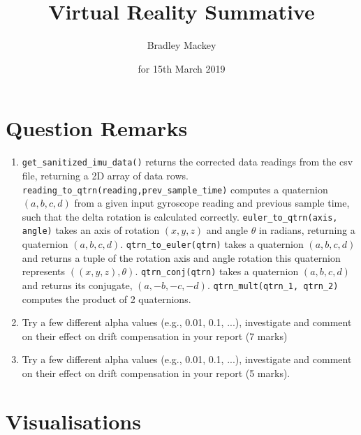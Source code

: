 \documentclass[11pt]{article}
\makeatletter
\newcommand{\skipitems}[1]{%
  \addtocounter{\@enumctr}{#1}%
}
\makeatother
\begin{document}
\title{\textbf{Virtual Reality Summative}}
\date{for 15th March 2019}
\author{Bradley Mackey}
\maketitle


\section*{Question Remarks}

\begin{enumerate}
\item \texttt{get\_sanitized\_imu\_data()} returns the corrected data readings from the csv file, returning a 2D array of data rows. \texttt{reading\_to\_qtrn(reading,prev\_sample\_time)} computes a quaternion $(a,b,c,d)$ from a given input gyroscope reading and previous sample time, such that the delta rotation is calculated correctly. \texttt{euler\_to\_qtrn(axis, angle)} takes an axis of rotation $(x,y,z)$ and angle $\theta$ in radians, returning a quaternion $(a,b,c,d)$.  \texttt{qtrn\_to\_euler(qtrn)} takes a quaternion $(a,b,c,d)$ and returns a tuple of the rotation axis and angle rotation this quaternion represents $((x,y,z),\theta)$. \texttt{qtrn\_conj(qtrn)} takes a quaternion $(a,b,c,d)$ and returns its conjugate, $(a,-b,-c,-d)$. \texttt{qtrn\_mult(qtrn\_1, qtrn\_2)} computes the product of 2 quaternions.

\skipitems{1} 


\item Try a few different alpha values (e.g., 0.01, 0.1, ...), investigate and comment on their effect on drift compensation in your report (7 marks)
\item Try a few different alpha values (e.g., 0.01, 0.1, ...), investigate and comment on their effect on drift compensation in your report (5 marks).
\end{enumerate}

\section*{Visualisations}
\end{document}
